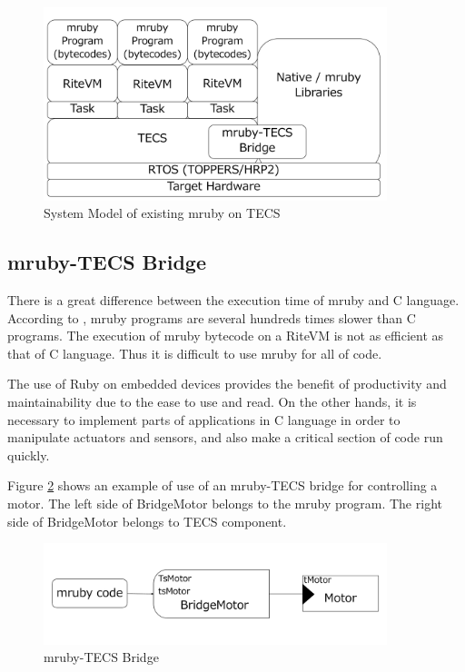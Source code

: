 \documentclass[a4j,12pt,oneside,openany,english]{jsbook}
\begin{document}
\begin{figure}[t]
    \centering
    \includegraphics[width=10cm,clip]{../EMSOFT2016/figure/mrubyontecs.pdf}
    \caption{System Model of existing mruby on TECS}
    \label{fig:mrubyontecs}
\end{figure}

\subsection{mruby-TECS Bridge}

There is a great difference between the execution time of mruby and C language.
According to  \cite{par:mrubyonTECS}, mruby programs are several hundreds times slower than C programs.
The execution of mruby bytecode on a RiteVM is not as efficient as that of C language.
Thus it is difficult to use mruby for all of code.

The use of Ruby on embedded devices provides the benefit of productivity and maintainability due to the ease to use and read.
On the other hands, it is necessary to implement parts of applications in C language in order to manipulate actuators and sensors, and also make a critical section of code run quickly.

Figure \ref{fig:mruby_TECS_bridge} shows an example of use of an mruby-TECS bridge for controlling a motor.
The left side of BridgeMotor belongs to the mruby program.
The right side of BridgeMotor belongs to TECS component.
\begin{figure}[t]
    \centering
    \includegraphics[width=10cm,clip]{../EMSOFT2016/figure/mruby_TECS_bridge.pdf}
    \caption{mruby-TECS Bridge}
    \label{fig:mruby_TECS_bridge}
\end{figure}
\end{document}

